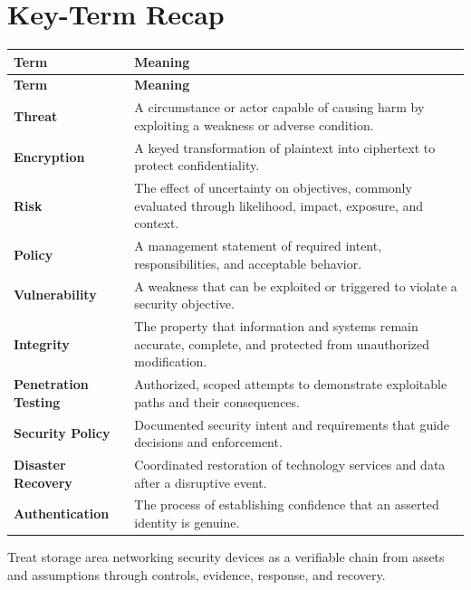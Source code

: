 \documentclass[11pt]{article}
\begin{document}
\section*{Key-Term Recap}
\begin{longtable}{>{\RaggedRight\arraybackslash}p{}>{\RaggedRight\arraybackslash}p{}}
\toprule\rowcolor{Navy}\color{white}\textbf{Term} & \color{white}\textbf{Meaning}\\\midrule
\endfirsthead
\toprule\rowcolor{Navy}\color{white}\textbf{Term} & \color{white}\textbf{Meaning}\\\midrule
\endhead
\textbf{Threat} & A circumstance or actor capable of causing harm by exploiting a weakness or adverse condition. \\\midrule
\textbf{Encryption} & A keyed transformation of plaintext into ciphertext to protect confidentiality. \\\midrule
\textbf{Risk} & The effect of uncertainty on objectives, commonly evaluated through likelihood, impact, exposure, and context. \\\midrule
\textbf{Policy} & A management statement of required intent, responsibilities, and acceptable behavior. \\\midrule
\textbf{Vulnerability} & A weakness that can be exploited or triggered to violate a security objective. \\\midrule
\textbf{Integrity} & The property that information and systems remain accurate, complete, and protected from unauthorized modification. \\\midrule
\textbf{Penetration Testing} & Authorized, scoped attempts to demonstrate exploitable paths and their consequences. \\\midrule
\textbf{Security Policy} & Documented security intent and requirements that guide decisions and enforcement. \\\midrule
\textbf{Disaster Recovery} & Coordinated restoration of technology services and data after a disruptive event. \\\midrule
\textbf{Authentication} & The process of establishing confidence that an asserted identity is genuine. \\\midrule
\bottomrule
\end{longtable}
\begin{takeawaybox}
Treat storage area networking security devices as a verifiable chain from assets and assumptions through controls, evidence, response, and recovery.
\end{takeawaybox}
\end{document}
